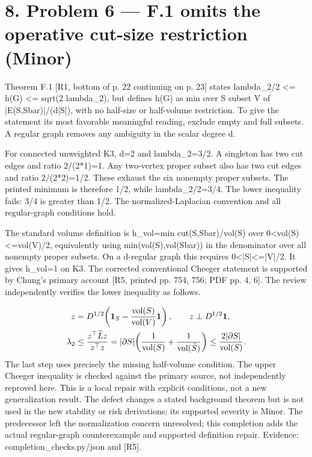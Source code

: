 \documentclass[10pt]{article}
\begin{document}
\section*{8. Problem 6 — F.1 omits the operative cut-size restriction (Minor)}
Theorem F.1 [R1, bottom of p. 22 continuing on p. 23] states lambda\_2/2 <= h(G) <= sqrt(2 lambda\_2), but defines h(G) as min over S subset V of |E(S,Sbar)|/(d|S|), with no half-size or half-volume restriction. To give the statement its most favorable meaningful reading, exclude empty and full subsets. A regular graph removes any ambiguity in the scalar degree d.\par
For connected unweighted K3, d=2 and lambda\_2=3/2. A singleton has two cut edges and ratio 2/(2*1)=1. Any two-vertex proper subset also has two cut edges and ratio 2/(2*2)=1/2. These exhaust the six nonempty proper subsets. The printed minimum is therefore 1/2, while lambda\_2/2=3/4. The lower inequality fails: 3/4 is greater than 1/2. The normalized-Laplacian convention and all regular-graph conditions hold.\par
The standard volume definition is h\_vol=min cut(S,Sbar)/vol(S) over 0<vol(S)<=vol(V)/2, equivalently using min(vol(S),vol(Sbar)) in the denominator over all nonempty proper subsets. On a d-regular graph this requires 0<|S|<=|V|/2. It gives h\_vol=1 on K3. The corrected conventional Cheeger statement is supported by Chung’s primary account [R5, printed pp. 754, 756; PDF pp. 4, 6]. The review independently verifies the lower inequality as follows.\par
\[\begin{aligned}
z&=D^{1/2}\!\left({\bf1}_S-\frac{\operatorname{vol}(S)}{\operatorname{vol}(V)}{\bf1}\right),
\qquad z\perp D^{1/2}{\bf1},\\
\lambda_2&\le\frac{z^\top\widehat Lz}{z^\top z}
=|\partial S|\!\left(\frac1{\operatorname{vol}(S)}+\frac1{\operatorname{vol}(\bar S)}\right)
\le\frac{2|\partial S|}{\operatorname{vol}(S)} .
\end{aligned}\] The last step uses precisely the missing half-volume condition. The upper Cheeger inequality is checked against the primary source, not independently reproved here. This is a local repair with explicit conditions, not a new generalization result. The defect changes a stated background theorem but is not used in the new stability or risk derivations; its supported severity is Minor. The predecessor left the normalization concern unresolved; this completion adds the actual regular-graph counterexample and supported definition repair. Evidence: completion\_checks.py/json and [R5].\par
\end{document}
